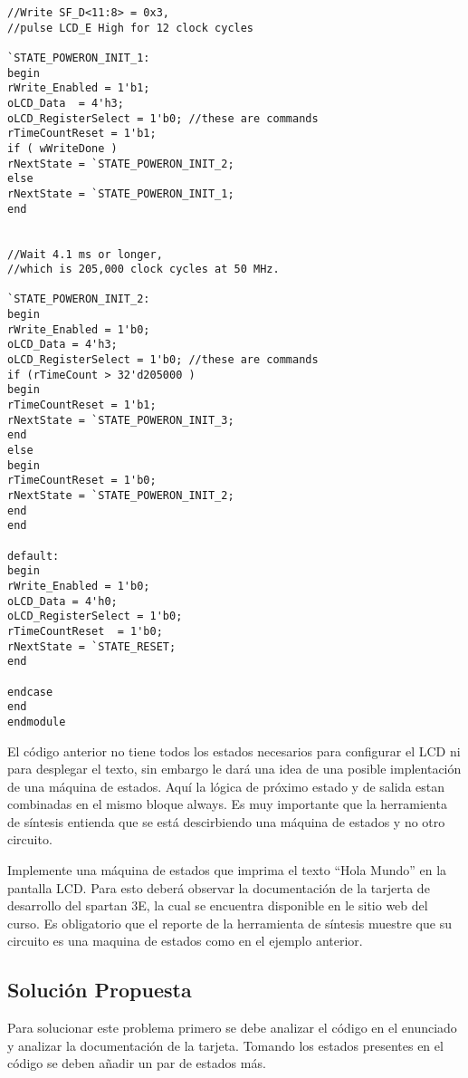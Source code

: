 \documentclass[10pt]{article}
\begin{document}
\begin{lstlisting}
//Write SF_D<11:8> = 0x3, 
//pulse LCD_E High for 12 clock cycles

`STATE_POWERON_INIT_1:
begin
rWrite_Enabled = 1'b1;
oLCD_Data  = 4'h3;
oLCD_RegisterSelect = 1'b0; //these are commands
rTimeCountReset = 1'b1;
if ( wWriteDone )
rNextState = `STATE_POWERON_INIT_2;
else
rNextState = `STATE_POWERON_INIT_1;
end


//Wait 4.1 ms or longer, 
//which is 205,000 clock cycles at 50 MHz.

`STATE_POWERON_INIT_2:
begin
rWrite_Enabled = 1'b0;
oLCD_Data = 4'h3;
oLCD_RegisterSelect = 1'b0; //these are commands
if (rTimeCount > 32'd205000 )
begin
rTimeCountReset = 1'b1;
rNextState = `STATE_POWERON_INIT_3;
end
else
begin
rTimeCountReset = 1'b0;
rNextState = `STATE_POWERON_INIT_2;
end
end

default:
begin
rWrite_Enabled = 1'b0;
oLCD_Data = 4'h0;
oLCD_RegisterSelect = 1'b0;
rTimeCountReset  = 1'b0;
rNextState = `STATE_RESET;
end

endcase
end
endmodule

\end{lstlisting}

El código anterior no tiene todos los estados necesarios para configurar el LCD ni para
desplegar el texto, sin embargo le dará una idea de una posible implentación de una máquina de estados. Aquí la lógica de próximo estado y de salida estan combinadas en el mismo bloque always.
Es muy importante que la herramienta de síntesis entienda que se está descirbiendo una máquina de estados y no otro circuito.

Implemente una máquina de estados que imprima el texto “Hola Mundo” en la pantalla LCD. Para esto deberá observar la documentación de la tarjerta de desarrollo del spartan 3E, la cual se encuentra disponible en le sitio web del curso. Es obligatorio que el reporte de  la herramienta de síntesis muestre que su circuito es una maquina de estados como en el ejemplo anterior.

\subsection*{Solución Propuesta}

Para solucionar este problema primero se debe analizar el código en el enunciado y analizar la documentación de la tarjeta. Tomando los estados presentes en el código se deben añadir un par de estados más.
\end{document}
